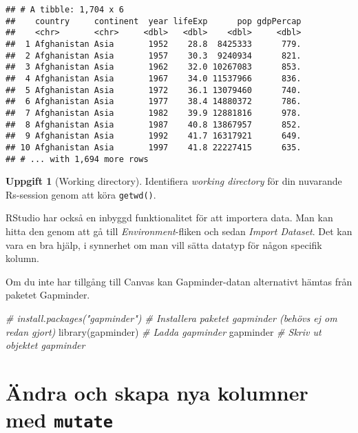 \documentclass[
]{book}
\newenvironment{Shaded}{\begin{snugshade}}{\end{snugshade}}
\newcommand{\CommentTok}[1]{\textcolor[rgb]{0.56,0.35,0.01}{\textit{#1}}}
\newcommand{\FunctionTok}[1]{\textcolor[rgb]{0.00,0.00,0.00}{#1}}
\newcommand{\NormalTok}[1]{#1}
\theoremstyle{definition}
\theoremstyle{definition}
\theoremstyle{definition}
\newtheorem{exercise}{Uppgift}[chapter]
\theoremstyle{definition}
\theoremstyle{remark}
\begin{document}
\begin{verbatim}
## # A tibble: 1,704 x 6
##    country     continent  year lifeExp      pop gdpPercap
##    <chr>       <chr>     <dbl>   <dbl>    <dbl>     <dbl>
##  1 Afghanistan Asia       1952    28.8  8425333      779.
##  2 Afghanistan Asia       1957    30.3  9240934      821.
##  3 Afghanistan Asia       1962    32.0 10267083      853.
##  4 Afghanistan Asia       1967    34.0 11537966      836.
##  5 Afghanistan Asia       1972    36.1 13079460      740.
##  6 Afghanistan Asia       1977    38.4 14880372      786.
##  7 Afghanistan Asia       1982    39.9 12881816      978.
##  8 Afghanistan Asia       1987    40.8 13867957      852.
##  9 Afghanistan Asia       1992    41.7 16317921      649.
## 10 Afghanistan Asia       1997    41.8 22227415      635.
## # ... with 1,694 more rows
\end{verbatim}

\begin{exercise}[Working directory]
Identifiera \emph{working directory} för din nuvarande Rs-session genom att köra \texttt{getwd()}.
\end{exercise}

RStudio har också en inbyggd funktionalitet för att importera data. Man kan hitta den genom att gå till \emph{Environment}-fliken och sedan \emph{Import Dataset}. Det kan vara en bra hjälp, i synnerhet om man vill sätta datatyp för någon specifik kolumn.

Om du inte har tillgång till Canvas kan Gapminder-datan alternativt hämtas från paketet Gapminder.

\begin{Shaded}
\begin{Highlighting}[]
\CommentTok{\# install.packages("gapminder")        \# Installera paketet gapminder (behövs ej om redan gjort)}
\FunctionTok{library}\NormalTok{(gapminder)                     }\CommentTok{\# Ladda gapminder}
\NormalTok{gapminder                              }\CommentTok{\# Skriv ut objektet gapminder}
\end{Highlighting}
\end{Shaded}

\hypertarget{uxe4ndra-och-skapa-nya-kolumner-med-mutate}{%
\section{\texorpdfstring{Ändra och skapa nya kolumner med \texttt{mutate}}{Ändra och skapa nya kolumner med mutate}}\label{uxe4ndra-och-skapa-nya-kolumner-med-mutate}}
\end{document}

